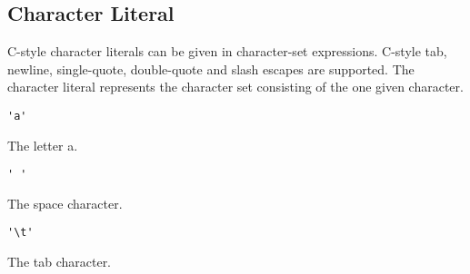 
\subsection{Character Literal}
{
	C-style character literals can be given in character-set expressions.
	C-style tab, newline, single-quote, double-quote and slash escapes are
	supported.
	The character literal represents the character set consisting of
	the one given character.
	
	\begin{itemize}
	{
		\item[] \lstinline[language=MAIA, columns=fixed]@'a'@
		
			The letter a.
		
		\item[] \lstinline[language=MAIA, columns=fixed]@' '@
		
			The space character.
		
		\item[] \lstinline[language=MAIA, columns=fixed]@'\t'@
		
			The tab character.
	}
	\end{itemize}
}
